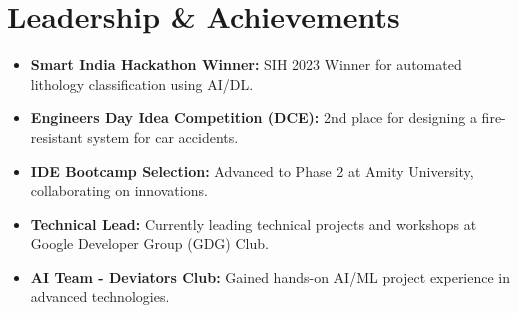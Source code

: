 \documentclass[letterpaper,11pt]{article}
\newcommand{\resumeItem}[1]{
  \item\small{
    {#1 \vspace{-2pt}}
  }
}
\newcommand{\resumeSubHeadingListStart}{\begin{itemize}[leftmargin=0.0in, label={}]}
\newcommand{\resumeSubHeadingListEnd}{\end{itemize}}
\begin{document}
\section{Leadership \& Achievements}
\resumeSubHeadingListStart
  \resumeItem{\textbf{Smart India Hackathon Winner:} SIH 2023 Winner for automated lithology classification using AI/DL.}
  \resumeItem{\textbf{Engineers Day Idea Competition (DCE):} 2nd place for designing a fire-resistant system for car accidents.}
  \resumeItem{\textbf{IDE Bootcamp Selection:} Advanced to Phase 2 at Amity University, collaborating on innovations.}
  \resumeItem{\textbf{Technical Lead:} Currently leading technical projects and workshops at Google Developer Group (GDG) Club.}
  \resumeItem{\textbf{AI Team - Deviators Club:} Gained hands-on AI/ML project experience in advanced technologies.}
\resumeSubHeadingListEnd
\end{document}
